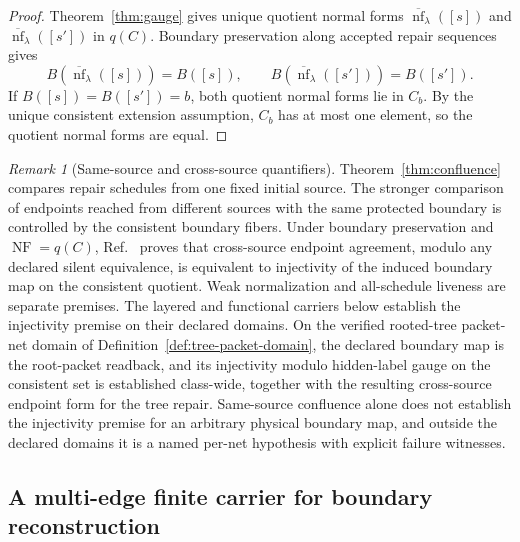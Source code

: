 \documentclass[11pt]{article}
\theoremstyle{remark}
\newtheorem{remark}[theorem]{Remark}
\theoremstyle{plain}
\begin{document}
\begin{proof}
Theorem~\ref{thm:gauge} gives unique quotient normal forms
\(\overline{\operatorname{nf}}_\lambda([s])\) and
\(\overline{\operatorname{nf}}_\lambda([s'])\) in \(q(C)\). Boundary preservation along accepted
repair sequences gives
\[
B(\overline{\operatorname{nf}}_\lambda([s]))=B([s]),
\qquad
B(\overline{\operatorname{nf}}_\lambda([s']))=B([s']).
\]
If \(B([s])=B([s'])=b\), both quotient normal forms lie in \(C_b\). By the unique consistent
extension assumption, \(C_b\) has at most one element, so the quotient normal forms are equal.
\end{proof}

\begin{remark}[Same-source and cross-source quantifiers]
Theorem~\ref{thm:confluence} compares repair schedules from one fixed initial source.  The
stronger comparison of endpoints reached from different sources with the same protected boundary
is controlled by the consistent boundary fibers.  Under boundary preservation and
\(\operatorname{NF}=q(C)\), Ref.~\cite{observableNormalForms} proves that cross-source endpoint
agreement, modulo any declared silent equivalence, is equivalent to injectivity of the induced
boundary map on the consistent quotient.  Weak normalization and all-schedule liveness are
separate premises.  The layered and functional carriers below establish the injectivity premise
on their declared domains.  On the verified rooted-tree packet-net domain of
Definition~\ref{def:tree-packet-domain}, the declared boundary map is the root-packet readback,
and its injectivity modulo hidden-label gauge on the consistent set is established class-wide,
together with the resulting cross-source endpoint form for the
tree repair.  Same-source confluence alone does not establish the injectivity premise for an
arbitrary physical boundary map, and outside the declared domains it is a named per-net
hypothesis with explicit failure witnesses.
\end{remark}

\subsection{A multi-edge finite carrier for boundary reconstruction}
\end{document}
